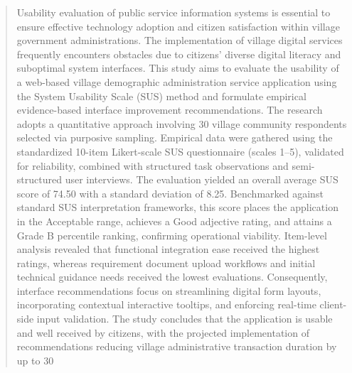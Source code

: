 \begin{abstract}

Usability evaluation of public service information systems is essential to ensure effective technology adoption and citizen satisfaction within village government administrations. The implementation of village digital services frequently encounters obstacles due to citizens' diverse digital literacy and suboptimal system interfaces. This study aims to evaluate the usability of a web-based village demographic administration service application using the System Usability Scale (SUS) method and formulate empirical evidence-based interface improvement recommendations. The research adopts a quantitative approach involving 30 village community respondents selected via purposive sampling. Empirical data were gathered using the standardized 10-item Likert-scale SUS questionnaire (scales 1--5), validated for reliability, combined with structured task observations and semi-structured user interviews. The evaluation yielded an overall average SUS score of 74.50 with a standard deviation of 8.25. Benchmarked against standard SUS interpretation frameworks, this score places the application in the Acceptable range, achieves a Good adjective rating, and attains a Grade B percentile ranking, confirming operational viability. Item-level analysis revealed that functional integration ease received the highest ratings, whereas requirement document upload workflows and initial technical guidance needs received the lowest evaluations. Consequently, interface recommendations focus on streamlining digital form layouts, incorporating contextual interactive tooltips, and enforcing real-time client-side input validation. The study concludes that the application is usable and well received by citizens, with the projected implementation of recommendations reducing village administrative transaction duration by up to 30%

\end{abstract}
